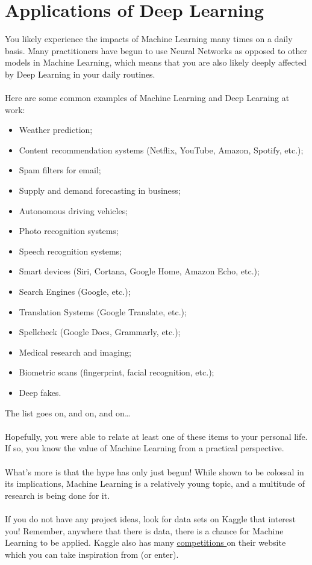 \documentclass{article}
\begin{document}
\section{Applications of Deep Learning}
You likely experience the impacts of Machine Learning many times on a daily basis. Many practitioners have begun to use Neural Networks as opposed to other models in Machine Learning, which means that you are also likely deeply affected by Deep Learning in your daily routines. 
\\
\\
Here are some common examples of Machine Learning and Deep Learning at work:
\begin{itemize}
    \item Weather prediction;
    \item Content recommendation systems (Netflix, YouTube, Amazon, Spotify, etc.);
    \item Spam filters for email;
    \item Supply and demand forecasting in business; 
    \item Autonomous driving vehicles;
    \item Photo recognition systems;
    \item Speech recognition systems;
    \item Smart devices (Siri, Cortana, Google Home, Amazon Echo, etc.);
    \item Search Engines (Google, etc.);
    \item Translation Systems (Google Translate, etc.);
    \item Spellcheck (Google Docs, Grammarly, etc.);
    \item Medical research and imaging;
    \item Biometric scans (fingerprint, facial recognition, etc.);
    \item Deep fakes.
\end{itemize}
The list goes on, and on, and on\ldots
\\
\\
Hopefully, you were able to relate at least one of these items to your personal life. If so, you know the value of Machine Learning from a practical perspective. 
\\
\\
What's more is that the hype has only just begun! While shown to be colossal in its implications, Machine Learning is a relatively young topic, and a multitude of research is being done for it. 
\\
\\
If you do not have any project ideas, look for data sets on Kaggle that interest you! Remember, anywhere that there is data, there is a chance for Machine Learning to be applied. Kaggle also has many \color{blue}\href{https://www.kaggle.com/competitions}{competitions }\color{black} on their website which you can take inspiration from (or enter). 
\end{document}
